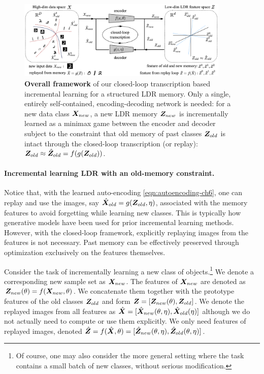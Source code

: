 \documentclass[../../book-main.tex]{subfiles}
\begin{document}
\begin{figure}[t]
\centering
\includegraphics[width=0.9\textwidth]{chapters/chapter5/figs/framework-v7.png}
\caption{\textbf{Overall framework} of our closed-loop transcription based incremental learning for a structured LDR memory. Only a single, entirely self-contained, encoding-decoding network is needed:  for a new data class $\bm{X}_{new}$, a new LDR memory $\bm{Z}_{new}$ is incrementally learned as a minimax game between the encoder and decoder subject to the constraint that old memory of past classes $\bm{Z}_{old}$ is intact through the closed-loop transcription (or replay): $\bm{Z}_{old} \approx \hat{\bm{Z}}_{old} = f(g(\bm{Z}_{old}))$.
\vspace{-0.2in}}
\label{fig:framework}
\end{figure}

\paragraph{Incremental learning LDR with an old-memory constraint.} 
Notice that, with the learned auto-encoding \eqref{eqn:autoencoding-ch6}, one can replay and use the images, say $\hat{\bm{X}}_{old} = g(\bm{Z}_{old}, \eta)$, associated with the memory features  to avoid forgetting while learning new classes. This is typically how generative models have been used for prior incremental learning methods. However, with the closed-loop framework, explicitly replaying images from the features is not necessary. Past memory can be effectively preserved through optimization exclusively on the features themselves.

Consider the task of incrementally learning a new class of objects.\footnote{Of course, one may also consider the more general setting where the task contains a small batch of new classes, without serious modification.} We denote a corresponding new sample set as $\bm{X}_{new}$. The features of $\bm{X}_{new}$ are denoted as  $\bm{Z}_{new}(\theta) = f(\bm{X}_{new}, \theta)$. We concatenate them together with the prototype features of the old classes $\bm{Z}_{old}$ and form $\bm{Z} = [\bm{Z}_{new}(\theta), \bm{Z}_{old}]$. We denote the replayed images from all features as $\hat{\bm{X}} = [{\hat{\bm{X}}_{new}(\theta,\eta)}, {\hat{\bm{X}}_{old}(\eta)}]$ although we do not actually need to compute or use them explicitly. We only need features of replayed images, denoted $\hat{\bm{Z}} = f(\hat{\bm{X}}, \theta) =  [{\hat{\bm{Z}}_{new}(\theta,\eta)}, {\hat{\bm{Z}}_{old}(\theta,\eta)}]$. 
\end{document}
